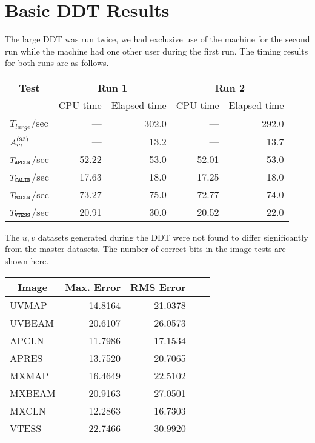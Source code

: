 \section{Basic DDT Results}

The large DDT was run twice, we had exclusive use of the machine for
the second run while the machine had one other user during the first
run.  The timing results for both runs are as follows.

\begin{tabular}{|l|r|r|r|r|}
\hline
\multicolumn{1}{|c|}{\bf{Test}} & \multicolumn{2}{c|}{\bf{Run 1}}
	& \multicolumn{2}{c|}{\bf{Run 2}} \\
\cline{2-5}
& \multicolumn{1}{|c|}{CPU time} & \multicolumn{1}{c|}{Elapsed time}
	& \multicolumn{1}{c|}{CPU time}
	& \multicolumn{1}{c|}{Elapsed time} \\
\hline
$T_{large}$/sec & --- & 302.0 & --- & 292.0 \\
$A_m^{(93)}$	  	& --- & 13.2 & --- & 13.7 \\
\hline
$T_{\tt APCLN}$/sec & 52.22 & 53.0 & 52.01 & 53.0 \\
$T_{\tt CALIB}$/sec & 17.63 & 18.0 & 17.25 & 18.0 \\
$T_{\tt MXCLN}$/sec & 73.27 & 75.0 & 72.77 & 74.0 \\
$T_{\tt VTESS}$/sec & 20.91 & 30.0 & 20.52 & 22.0 \\
\hline
\end{tabular}

The $u,v$ datasets generated during the DDT were not found to differ
significantly from the master datasets.  The number of correct bits in
the image tests are shown here.

\begin{tabular}{|l|r|r|r|r|}
\hline
\multicolumn{1}{|c|}{\bf Image} &  \multicolumn{1}{c|}{Max. Error}
	& \multicolumn{1}{c|}{RMS Error} \\
\hline
UVMAP & 14.8164 & 21.0378 \\
UVBEAM & 20.6107 & 26.0573 \\
APCLN & 11.7986 & 17.1534 \\
APRES & 13.7520 & 20.7065 \\
MXMAP & 16.4649 & 22.5102 \\
MXBEAM & 20.9163 & 27.0501 \\
MXCLN & 12.2863 & 16.7303 \\
VTESS & 22.7466 & 30.9920 \\
\hline
\end{tabular}

